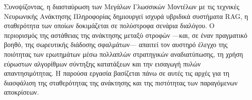 Συνοψίζοντας, η διασταύρωση των Μεγάλων Γλωσσικών Μοντέλων με τις τεχνικές Νευρωνικής Ανάκτησης Πληροφορίας δημιουργεί ισχυρά υβριδικά συστήματα RAG, η σταθερότητα των οποίων δοκιμάζεται σε πολύστροφα σενάρια διαλόγου. Ο περιορισμός της αστάθειας της ανάκτησης μεταξύ στροφών ---και, σε έναν πραγματικό βοηθό, της σωρευτικής διάδοσης σφαλμάτων--- απαιτεί τον αυστηρό έλεγχο της ποιότητας των ερωτημάτων μέσω πολλαπλών στρατηγικών αναδιατύπωσης, τη χρήση εύρωστων αλγορίθμων σύντηξης κατατάξεων και την εισαγωγή πυλών απαντησιμότητας. Η παρούσα εργασία βασίζεται πάνω σε αυτές τις αρχές για τη διασφάλιση της σταθερότητας της ανάκτησης και της πιστότητας των παραγόμενων αποκρίσεων.